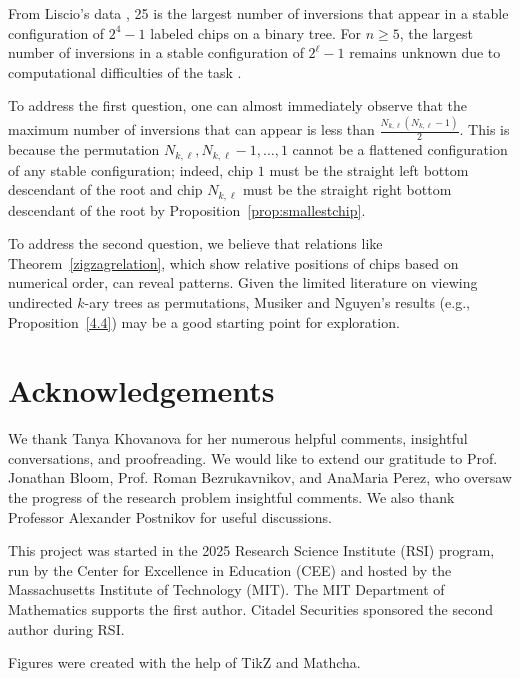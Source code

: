 \documentclass[11pt]{article}
\theoremstyle{remark}
\theoremstyle{definition}
\begin{document}
From Liscio's data \cite{liscio}, 25 is the largest number of inversions that appear in a stable configuration of $2^4-1$ labeled chips on a binary tree. For $n \geq 5$, the largest number of inversions in a stable configuration of \(2^{\ell}-1\) remains unknown due to computational difficulties of the task \cite{MR4827886}.


To address the first question, one can almost immediately observe that the maximum number of inversions that can appear is less than $\frac{N_{k, \ell}(N_{k, \ell}-1)}{2}$. This is because the permutation $N_{k, \ell}, N_{k, \ell}-1, \dots, 1$ cannot be a flattened configuration of any stable configuration; indeed, chip $1$ must be the straight left bottom descendant of the root and chip $N_{k, \ell}$ must be the straight right bottom descendant of the root by Proposition~\ref{prop:smallestchip}. 

To address the second question, we believe that relations like Theorem~\ref{zigzagrelation}, which show relative positions of chips based on numerical order, can reveal patterns. Given the limited literature on viewing undirected $k$-ary trees as permutations, Musiker and Nguyen's results (e.g., Proposition~\ref{4.4}) may be a good starting point for exploration. 

\section{Acknowledgements}


We thank Tanya Khovanova for her numerous helpful comments, insightful conversations, and proofreading.  We would like to extend our gratitude to Prof. Jonathan Bloom, Prof. Roman Bezrukavnikov, and AnaMaria Perez, who oversaw the progress of the research problem insightful comments. We also thank Professor Alexander Postnikov for useful discussions.
 
This project was started in the 2025 Research Science Institute (RSI) program, run by the Center for Excellence in Education (CEE) and hosted by the Massachusetts Institute of Technology (MIT). The MIT Department of Mathematics supports the first author. Citadel Securities sponsored the second author during RSI.

Figures were created with the help of TikZ and Mathcha.

\end{document}
